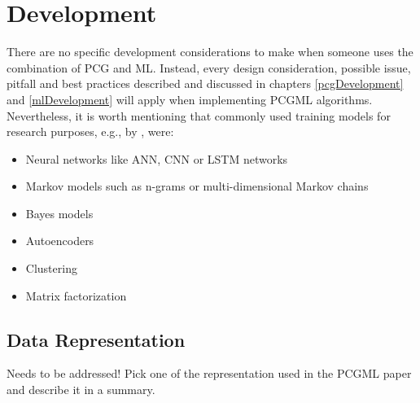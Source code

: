 \documentclass[MGS,Master,english]{twbook}%
\begin{document}
\section{Development}
{\color{blue}There are no specific development considerations to make when someone uses the combination of PCG and ML. Instead, every design consideration, possible issue, pitfall and best practices described and discussed in chapters \ref{pcgDevelopment} and \ref{mlDevelopment} will apply when implementing PCGML algorithms.\\
Nevertheless, it is worth mentioning that commonly used training models for research purposes, e.g., by \cite{pcgml::paper}, were:
\begin{itemize}
	\item Neural networks like \ac{ANN}, \ac{CNN} or \ac{LSTM} networks
	\item Markov models such as n-grams or multi-dimensional Markov chains
	\item Bayes models
	\item Autoencoders
	\item Clustering
	\item Matrix factorization
\end{itemize} 
}


\subsection{Data Representation}
{\color{blue} Needs to be addressed! Pick one of the representation used in the PCGML paper and describe it in a summary.}

\end{document}
